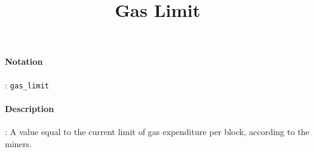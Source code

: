 \documentclass[10pt,a4paper,oneside]{scrartcl}
\author{}
\title{Gas Limit}
\date{}
\begin{document}
\maketitle
\paragraph{Notation}: \texttt{gas\_limit}
\paragraph{Description}: A value equal to the current limit of gas expenditure per block, according to the miners. 
\end{document}
